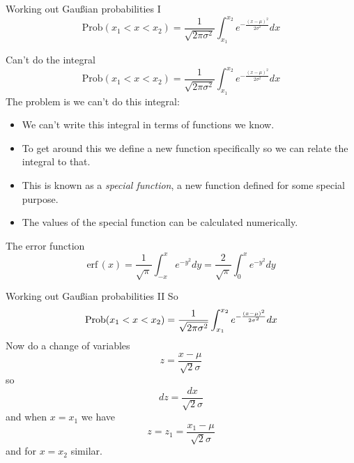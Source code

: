 \documentclass{beamer}
\begin{document}
\begin{frame}{Working out Gau\ss{}ian probabilities I}
\color{purple}
$$
\mbox{Prob}(x_1<x<x_2)=\frac{1}{\sqrt{2\pi\sigma^2}}\int_{x_1}^{x_2} e^{-\frac{(x-\mu)^2}{2\sigma^2}}dx
$$
\vskip -1cm
\color{black}
\begin{center}

\end{center}
\end{frame}


\begin{frame}{Can't do the integral}
\color{reddish}
$$
\mbox{Prob}(x_1<x<x_2)=\frac{1}{\sqrt{2\pi\sigma^2}}\int_{x_1}^{x_2} e^{-\frac{(x-\mu)^2}{2\sigma^2}}dx
$$
\color{black}
The problem is we can't do this integral:
\begin{itemize}
\item We can't write this integral in terms of functions we know.
\item To get around this we define a new function specifically so we can relate the integral to that.
\item This is known as a \textsl{special function}, a new function defined for some special purpose.
\item The values of the special function can be calculated numerically.
\end{itemize}
\end{frame}


\begin{frame}{The error function}
\color{purple}
$$
\mbox{erf}\,(x)=\frac{1}{\sqrt{\pi}}\int_{-x}^xe^{-y^2}dy=\frac{2}{\sqrt{\pi}}\int_0^xe^{-y^2}dy
$$
\vskip -1cm
\color{black}
\begin{center}

\end{center}
\end{frame}



\begin{frame}{Working out Gau\ss{}ian probabilities II}
So
\color{reddish}
$$
\mbox{Prob}(x_1<x<x_2)=\frac{1}{\sqrt{2\pi\sigma^2}}
\color{blueish}\int^{x_2}_{x_1}\color{reddish} 
e^{-\frac{(\color{blueish}{}x\color{reddish}-\mu)^2}{2\sigma^2}}\color{blueish}{}dx\color{reddish}
$$
\color{black}
Now do a change of variables
\color{blueish}{}
$$
z=\frac{x-\mu}{\sqrt{2}\sigma}
$$
\color{black}
so 
\color{blueish}{}
$$
dz=\frac{dx}{\sqrt{2}\sigma}
$$
\color{black}
and when \color{blueish}{}$x=x_1$\color{black}{} we have
\color{blueish}{}
$$
z=z_1=\frac{x_1-\mu}{\sqrt{2}\sigma}
$$
\color{black}
and for \color{blueish}{}$x=x_2$\color{black}{} similar.


\end{frame}
\end{document}
